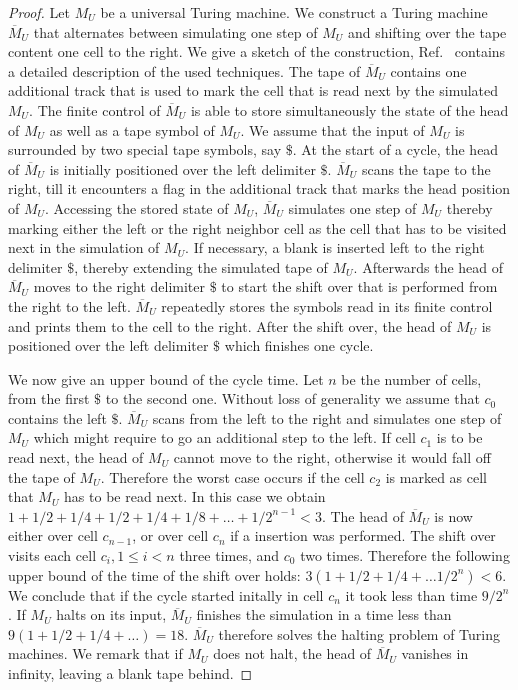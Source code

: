 \documentclass[pre,showpacs,showkeys,preprint]{revtex4}
\theoremstyle{definition}
\begin{document}
\begin{proof}
Let $M_U$ be a universal Turing machine.
We construct a Turing machine $\overline{M}_U$ that alternates between simulating one step of $M_U$ and shifting over
the tape content one cell to the right.
We give a sketch of the construction, Ref.~\cite{hopcroft} contains a detailed description of the used techniques.
The tape of $\overline{M}_U$ contains one additional track that is used
to mark the cell  that is read next by the simulated $M_U$.
The finite control of $\overline{M}_U$ is able to store simultaneously the state of the head of $M_U$ as well
as a tape symbol of $M_U$.
We assume that the input of $M_U$ is surrounded by two special tape symbols, say $\$$.
At the start of a cycle, the head of $\overline{M}_U$ is initially positioned over the left delimiter $\$$.
$\overline{M}_U$ scans the tape to the right, till it encounters a flag in the additional track that marks the head position of $M_U$.
Accessing the stored state of $M_U$, $\overline{M}_U$ simulates one step of $M_U$ thereby marking
either the left or the right neighbor cell as the cell that has to be visited next in the simulation of $M_U$.
If necessary, a blank is inserted left to the right delimiter $\$$, thereby extending the simulated tape of $M_U$.
Afterwards the head of $\overline{M}_U$ moves to the right delimiter $\$$ to start the shift over that is
performed from the right to the left.
$\overline{M}_U$ repeatedly stores the symbols read in its finite control and prints them to the cell to the right.
After the shift over, the head of $M_U$ is positioned over the left delimiter $\$$ which finishes one cycle.

We now give an upper bound of the cycle time.
Let $n$ be the number of cells, from the first $\$$ to the second one.
Without loss of generality we assume that $c_0$ contains the left $\$$.
$\overline{M}_U$ scans from the left to the right and simulates one step of $M_U$ which might require to go an
additional step to the left.
If cell $c_1$ is to be read next, the head of $M_U$ cannot move to the right, otherwise it would fall off the
tape of $M_U$.
Therefore the worst case occurs if the cell $c_2$ is marked as cell that $M_U$ has to be read next.
In this case we obtain $1 + 1/2 + 1/4 + 1/2 + 1/4 + 1/8 + \ldots  + 1/2^{n-1} < 3$.
The head of $\overline{M}_U$ is now either over cell $c_{n-1}$, or over cell $c_n$ if a insertion was performed.
The shift over visits each cell $c_i, 1 \leq i < n$ three times, and $c_0$ two times.
Therefore the following upper bound of the time of the shift over holds:
$3(1 + 1/2 + 1/4 + \ldots 1/2^n) < 6$.
We conclude that if the cycle started initally in cell $c_n$ it took less than time $9/2^n$.
If $M_U$ halts on its input, $\overline{M}_U$ finishes the simulation in a time less than
$9(1 + 1/2 + 1/4 + \ldots) = 18$.
$\overline{M}_U$ therefore solves the halting problem of Turing machines.
We remark that if $M_U$ does not halt, the head of $\overline{M}_U$ vanishes in infinity, leaving a blank tape behind.
\end{proof}
\end{document}
